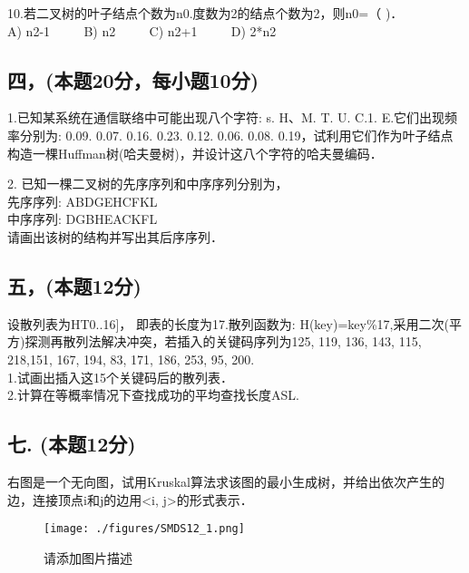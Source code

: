 10.若二叉树的叶子结点个数为n0.度数为2的结点个数为2，则n0=（ )． \\
A) n2-1 $\qquad$ B) n2 $\qquad$ C) n2+1 $\qquad$ D) 2*n2

\subsection{四，(本题20分，每小题10分)}

1.已知某系统在通信联络中可能出现八个字符: s. H、M. T. U. C.1. E.它们出现频率分别为: 0.09. 0.07. 0.16. 0.23. 0.12. 0.06. 0.08. 0.19，试利用它们作为叶子结点构造一棵Huffman树(哈夫曼树)，并设计这八个字符的哈夫曼编码．

2. 已知一棵二叉树的先序序列和中序序列分别为， \\
先序序列: ABDGEHCFKL \\
中序序列: DGBHEACKFL \\
请画出该树的结构并写出其后序序列．

\subsection{五，(本题12分)}
设散列表为HT0..16]， 即表的长度为17.散列函数为: H(key)=key\%17,采用二次(平方)探测再散列法解决冲突，若插入的关键码序列为{125, 119, 136, 143, 115, 218,151, 167, 194, 83, 171, 186, 253, 95, 200}. \\
1.试画出插入这15个关键码后的散列表． \\
2.计算在等概率情况下查找成功的平均查找长度ASL.

\subsection{七. (本题12分)}
右图是一个无向图，试用Kruskal算法求该图的最小生成树，并给出依次产生的边，连接顶点i和j的边用<i, j>的形式表示．
\begin{figure}[ht]
\centering
\texttt{[image: ./figures/SMDS12\_1.png]}
\caption{请添加图片描述} \label{SMDS12_fig1}
\end{figure}
